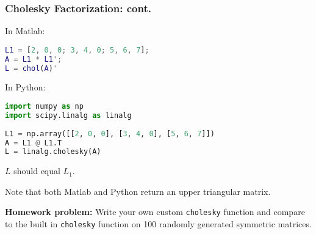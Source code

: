 \documentclass{beamer}
\begin{document}
\begin{frame}[fragile]\frametitle{Cholesky Factorization: cont.}
In Matlab:
	
\begin{lstlisting}[language=Matlab]
L1 = [2, 0, 0; 3, 4, 0; 5, 6, 7];
A = L1 * L1';
L = chol(A)'	
\end{lstlisting}

\vfill
	
In Python:

\begin{lstlisting}[language=Python]
import numpy as np
import scipy.linalg as linalg
		
L1 = np.array([[2, 0, 0], [3, 4, 0], [5, 6, 7]])
A = L1 @ L1.T
L = linalg.cholesky(A)
\end{lstlisting}	

$L$ should equal $L_1$.

\vfill

Note that both Matlab and Python return an upper triangular matrix.

\vfill

{\bf Homework problem:}  Write your own custom \texttt{cholesky} function and compare to the built in \texttt{cholesky} function on 100 randomly generated symmetric matrices.
\end{frame}
\end{document}
